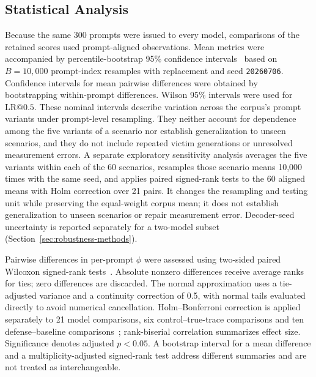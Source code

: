 \documentclass[electronics,article,submit,pdftex,moreauthors]{Definitions/mdpi}
\begin{document}
\subsection{Statistical Analysis}
Because the same 300 prompts were issued to every model, comparisons of the retained scores used prompt-aligned observations. Mean metrics were accompanied by percentile-bootstrap 95\% confidence intervals~\cite{efron1994bootstrap} based on $B=10{,}000$ prompt-index resamples with replacement and seed \texttt{20260706}. Confidence intervals for mean pairwise differences were obtained by bootstrapping within-prompt differences. Wilson 95\% intervals were used for $\mathrm{LR}@0.5$. These nominal intervals describe variation across the corpus's prompt variants under prompt-level resampling. They neither account for dependence among the five variants of a scenario nor establish generalization to unseen scenarios, and they do not include repeated victim generations or unresolved measurement errors. A separate exploratory sensitivity analysis averages the five variants within each of the 60 scenarios, resamples those scenario means 10,000 times with the same seed, and applies paired signed-rank tests to the 60 aligned means with Holm correction over 21 pairs. It changes the resampling and testing unit while preserving the equal-weight corpus mean; it does not establish generalization to unseen scenarios or repair measurement error. Decoder-seed uncertainty is reported separately for a two-model subset (Section~\ref{sec:robustness-methods}).

Pairwise differences in per-prompt $\phi$ were assessed using two-sided paired Wilcoxon signed-rank tests~\cite{wilcoxon1945individual}. Absolute nonzero differences receive average ranks for ties; zero differences are discarded. The normal approximation uses a tie-adjusted variance and a continuity correction of 0.5, with normal tails evaluated directly to avoid numerical cancellation. Holm--Bonferroni correction is applied separately to 21 model comparisons, six control--true-trace comparisons and ten defense--baseline comparisons~\cite{holm1979simple}; rank-biserial correlation summarizes effect size. Significance denotes adjusted $p<0.05$. A bootstrap interval for a mean difference and a multiplicity-adjusted signed-rank test address different summaries and are not treated as interchangeable.
\end{document}
